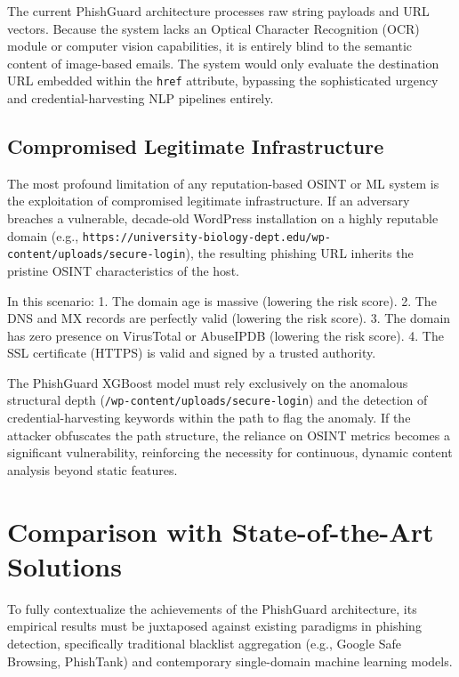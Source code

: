 The current PhishGuard architecture processes raw string payloads and
URL vectors. Because the system lacks an Optical Character Recognition
(OCR) module or computer vision capabilities, it is entirely blind to
the semantic content of image-based emails. The system would only
evaluate the destination URL embedded within the \texttt{href}
attribute, bypassing the sophisticated urgency and credential-harvesting
NLP pipelines entirely.

\subsection{Compromised Legitimate
Infrastructure}\label{compromised-legitimate-infrastructure}

The most profound limitation of any reputation-based OSINT or ML system
is the exploitation of compromised legitimate infrastructure. If an
adversary breaches a vulnerable, decade-old WordPress installation on a
highly reputable domain (e.g.,
\texttt{https://university-biology-dept.edu/wp-content/uploads/secure-login}),
the resulting phishing URL inherits the pristine OSINT characteristics
of the host.

In this scenario: 1. The domain age is massive (lowering the risk
score). 2. The DNS and MX records are perfectly valid (lowering the risk
score). 3. The domain has zero presence on VirusTotal or AbuseIPDB
(lowering the risk score). 4. The SSL certificate (HTTPS) is valid and
signed by a trusted authority.

The PhishGuard XGBoost model must rely exclusively on the anomalous
structural depth (\texttt{/wp-content/uploads/secure-login}) and the
detection of credential-harvesting keywords within the path to flag the
anomaly. If the attacker obfuscates the path structure, the reliance on
OSINT metrics becomes a significant vulnerability, reinforcing the
necessity for continuous, dynamic content analysis beyond static
features.

\section{Comparison with State-of-the-Art
Solutions}\label{comparison-with-state-of-the-art-solutions}

To fully contextualize the achievements of the PhishGuard architecture,
its empirical results must be juxtaposed against existing paradigms in
phishing detection, specifically traditional blacklist aggregation
(e.g., Google Safe Browsing, PhishTank) and contemporary single-domain
machine learning models.

